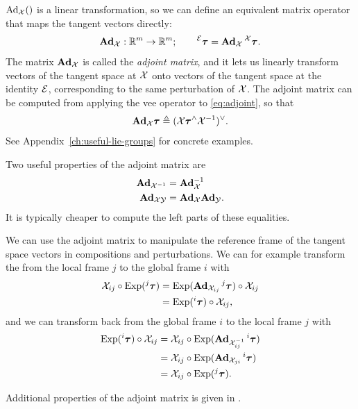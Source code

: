 $\operatorname{Ad}_{\mathcal{X}}()$ is a linear transformation, so we can define an equivalent matrix operator that maps the tangent vectors directly:
\begin{equation}
  \boldsymbol{\mathbf{Ad}}_{\mathcal{X}}: {\mathbb R}^m \to {\mathbb R}^m; \quad\quad \prescript{\mathcal{E}}{}{{\boldsymbol{\mathbf{\tau}}}} = \boldsymbol{\mathbf{Ad}}_{\mathcal{X}} \prescript{\mathcal{X}}{}{{\boldsymbol{\mathbf{\tau}}}}.
\end{equation}
The matrix $\boldsymbol{\mathbf{Ad}}_{\mathcal{X}}$ is called the \emph{adjoint matrix}, and it lets us linearly transform vectors of the tangent space at $\mathcal{X}$ onto vectors of the tangent space at the identity $\mathcal{E}$, corresponding to the same perturbation of $\mathcal{X}$.
The adjoint matrix can be computed from applying the vee operator to \eqref{eq:adjoint}, so that
\begin{equation} \label{eq:adjoint-matrix}
  \boldsymbol{\mathbf{Ad}}_{\mathcal{X}} {\boldsymbol{\mathbf{\tau}}} \triangleq (\mathcal{X} {\boldsymbol{\mathbf{\tau}}}^\wedge \mathcal{X}^{-1})^\vee.
\end{equation}
See Appendix~\ref{ch:useful-lie-groups} for concrete examples.

Two useful properties of the adjoint matrix are
\begin{align}
    \boldsymbol{\mathbf{Ad}}_{\mathcal{X}^{-1}} &= \boldsymbol{\mathbf{Ad}}_{\mathcal{X}}^{-1}\\
    \boldsymbol{\mathbf{Ad}}_{\mathcal{X} \mathcal{Y}} &= \boldsymbol{\mathbf{Ad}}_{\mathcal{X}} \boldsymbol{\mathbf{Ad}}_{\mathcal{Y}}.
\end{align}
It is typically cheaper to compute the left parts of these equalities.

We can use the adjoint matrix to manipulate the reference frame of the tangent space vectors in compositions and perturbations.
We can for example transform the from the local frame $j$ to the global frame $i$ with
\begin{align}
    \mathcal{X}_{ij} \circ \operatorname*{Exp}(\prescript{j}{}{{\boldsymbol{\mathbf{\tau}}}})
    &= \operatorname*{Exp}(\boldsymbol{\mathbf{Ad}}_{\mathcal{X}_{ij}} \prescript{j}{}{{\boldsymbol{\mathbf{\tau}}}}) \circ \mathcal{X}_{ij}\\
    &= \operatorname*{Exp}(\prescript{i}{}{{\boldsymbol{\mathbf{\tau}}}}) \circ \mathcal{X}_{ij},
\end{align}
and we can transform back from the global frame $i$ to the local frame $j$ with
\begin{align}
    \operatorname*{Exp}(\prescript{i}{}{{\boldsymbol{\mathbf{\tau}}}}) \circ \mathcal{X}_{ij}
    &= \mathcal{X}_{ij} \circ \operatorname*{Exp}(\boldsymbol{\mathbf{Ad}}_{\mathcal{X}_{ij}^{-1}} \prescript{i}{}{{\boldsymbol{\mathbf{\tau}}}})\\  
    &= \mathcal{X}_{ij} \circ \operatorname*{Exp}(\boldsymbol{\mathbf{Ad}}_{\mathcal{X}_{ji}} \prescript{i}{}{{\boldsymbol{\mathbf{\tau}}}})\\ 
    &= \mathcal{X}_{ij} \circ \operatorname*{Exp}(\prescript{j}{}{{\boldsymbol{\mathbf{\tau}}}}).
\end{align}

Additional properties of the adjoint matrix is given in \cite{SolaARobotics, barfoot2017state}.

